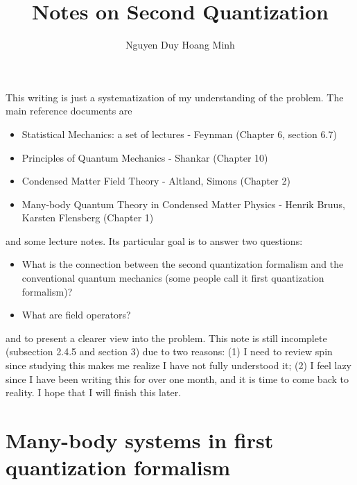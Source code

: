 \documentclass[a4paper,12pts]{article}
\numberwithin{equation}{section}
\begin{document}
	\title{\textbf{Notes on Second Quantization}\vspace{-2ex}}
	\author{Nguyen Duy Hoang Minh}
	\date{\vspace{-2ex}}
	\maketitle
	
	\tableofcontents
	\bigbreak\bigbreak\bigbreak\bigbreak
	\noindent This writing is just a systematization of my understanding of the problem. The main reference documents are
	\begin{itemize}
		\item Statistical Mechanics: a set of lectures - Feynman (Chapter 6, section 6.7)
		\item Principles of Quantum Mechanics - Shankar (Chapter 10)
		\item Condensed Matter Field Theory - Altland, Simons (Chapter 2)
		\item Many-body Quantum Theory in Condensed Matter Physics - Henrik Bruus, Karsten Flensberg (Chapter 1)
	\end{itemize}
	and some lecture notes. Its particular goal is to answer two questions:
	\begin{itemize}
		\item[+] What is the connection between the second quantization formalism and the conventional quantum mechanics (some people call it first quantization formalism)?
		\item[+] What are field operators?
	\end{itemize}
	and to present a clearer view into the problem. This note is still incomplete (subsection 2.4.5 and section 3) due to two reasons: (1) I need to review spin since studying this makes me realize I have not fully understood it; (2) I feel lazy since I have been writing this for over one month, and it is time to come back to reality. I hope that I will finish this later.
	\pagebreak
	\section{Many-body systems in first quantization formalism}
\end{document}
